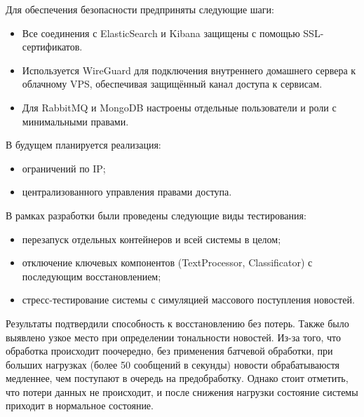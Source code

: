 Для обеспечения безопасности предприняты следующие шаги:
\begin{itemize}
  \item Все соединения с ElasticSearch и Kibana защищены с помощью SSL-сертификатов.
  \item Используется WireGuard для подключения внутреннего домашнего сервера к облачному VPS, обеспечивая защищённый канал доступа к сервисам.
  \item Для RabbitMQ и MongoDB настроены отдельные пользователи и роли с минимальными правами.
\end{itemize}

В будущем планируется реализация:
\begin{itemize}
  \item ограничений по IP;
  \item централизованного управления правами доступа.
\end{itemize}

\label{subsec:testing}
В рамках разработки были проведены следующие виды тестирования:
\begin{itemize}
  \item перезапуск отдельных контейнеров и всей системы в целом;
  \item отключение ключевых компонентов (TextProcessor, Classificator) с последующим восстановлением;
  \item стресс-тестирование системы с симуляцией массового поступления новостей.
\end{itemize}

Результаты подтвердили способность к восстановлению без потерь.
Также было выявлено узкое место при определении тональности новостей.
Из-за того, что обработка происходит поочередно, без применения батчевой обработки, при больших нагрузках (более 50 сообщений в секунды) новости обрабатываюстя медленнее, чем поступают в очередь на предобработку.
Однако стоит отметить, что потери данных не происходит, и после снижения нагрузки состояние системы приходит в нормальное состояние.
